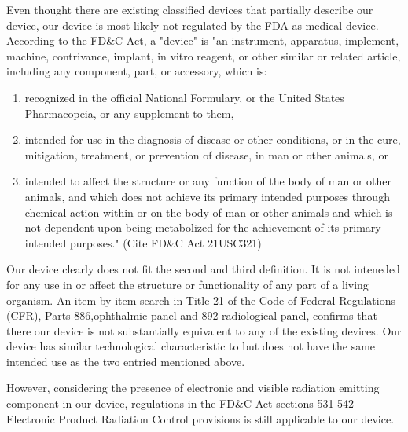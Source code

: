 \documentclass{article}
\begin{document}
Even thought there are existing classified devices that partially
describe our device, our device is most likely not regulated by the
FDA as medical device. According to the FD\&C Act, a "device" is "an
instrument, apparatus, implement, machine, contrivance, implant, in
vitro reagent, or other similar or related article, including any
component, part, or accessory, which is:

\begin{enumerate}
\item recognized in the official National Formulary, or the United
  States Pharmacopeia, or any supplement to them,
\item intended for use in the diagnosis of disease or other
  conditions, or in the cure, mitigation, treatment, or prevention of
  disease, in man or other animals, or
\item intended to affect the structure or any function of the body of
  man or other animals, and which does not achieve its primary
  intended purposes through chemical action within or on the body of
  man or other animals and which is not dependent upon being
  metabolized for the achievement of its primary intended purposes."
  (Cite FD\&C Act 21USC321)
\end{enumerate}

Our device clearly does not fit the second and third definition. It is
not inteneded for any use in or affect the structure or functionality
of any part of a living organism. An item by item search in Title 21
of the Code of Federal Regulations (CFR), Parts 886,ophthalmic panel
and 892 radiological panel, confirms that there our device is not
substantially equivalent to any of the existing devices. Our device
has similar technological characteristic to but does not have the same
intended use as the two entried mentioned above.

However, considering the presence of electronic and visible radiation
emitting component in our device, regulations in the FD\&C Act
sections 531-542 Electronic Product Radiation Control provisions is
still applicable to our device.









\end{document}
